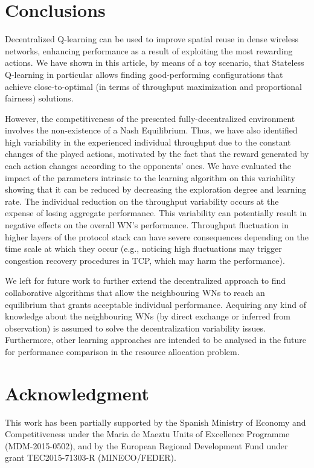 \documentclass{article}
\begin{document}
	\section{Conclusions }
	\label{section:conclusions}		
	Decentralized Q-learning can be used to improve spatial reuse in dense wireless networks, enhancing performance as a result of exploiting the most rewarding actions. We have shown in this article, by means of a toy scenario, that Stateless Q-learning in particular allows finding good-performing configurations that achieve close-to-optimal (in terms of throughput maximization and proportional fairness) solutions. 
	
	However, the competitiveness of the presented fully-decentralized environment involves the non-existence of a Nash Equilibrium. Thus, we have also identified high variability in the experienced individual throughput due to the constant changes of the played actions, motivated by the fact that the reward generated by each action changes according to the opponents' ones. We have evaluated the impact of the parameters intrinsic to the learning algorithm on this variability showing that it can be reduced by decreasing the exploration degree and learning rate. The individual reduction on the throughput variability occurs at the expense of losing aggregate performance. This variability can potentially result in negative effects on the overall WN's performance. Throughput fluctuation in higher layers of the protocol stack can have severe consequences depending on the time scale at which they occur (e.g., noticing high fluctuations may trigger congestion recovery procedures in TCP, which may harm the performance). 
	
	We left for future work to further extend the decentralized approach to find collaborative algorithms that allow the neighbouring WNs to reach an equilibrium that grants acceptable individual performance. Acquiring any kind of knowledge about the neighbouring WNs (by direct exchange or inferred from observation) is assumed to solve the decentralization variability issues. 
	Furthermore, other learning approaches are intended to be analysed in the future for performance comparison in the resource allocation problem. 
	
	\section*{Acknowledgment}
	This work has been partially supported by the Spanish Ministry of Economy and Competitiveness under the Maria de Maeztu Units of Excellence Programme (MDM-2015-0502), and by the European Regional Development Fund under grant TEC2015-71303-R (MINECO/FEDER). 
	
\end{document}
